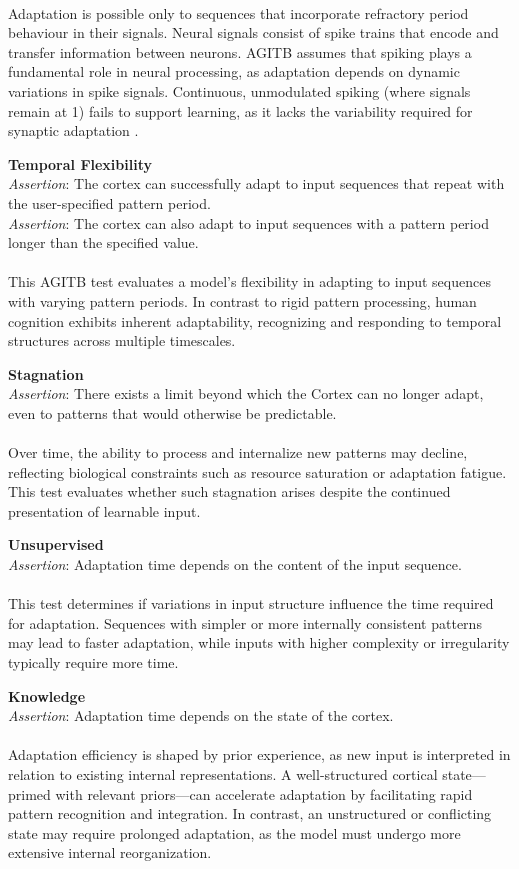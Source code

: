 \documentclass{article}
\newcommand{\agitbtest}[2]{
  \item
  \begin{minipage}[t]{\linewidth}
    \textbf{#1} \\[0.5ex]
    #2
  \end{minipage}
}
\begin{document}
\begin{agitblist}
{\\
Adaptation is possible only to sequences that incorporate refractory period behaviour in their signals. Neural signals consist of spike trains that encode and transfer information between neurons. AGITB assumes that spiking plays a fundamental role in neural processing, as adaptation depends on dynamic variations in spike signals. Continuous, unmodulated spiking (where signals remain at 1) fails to support learning, as it lacks the variability required for synaptic adaptation \cite{Gerstner2002}. 
}
\agitbtest{Temporal Flexibility}{
\emph{Assertion}: The cortex can successfully adapt to input sequences that repeat with the user-specified pattern period.\\
\emph{Assertion}: The cortex can also adapt to input sequences with a pattern period longer than the specified value.\\
\\
This AGITB test evaluates a model’s flexibility in adapting to input sequences with varying pattern periods. In contrast to rigid pattern processing, human cognition exhibits inherent adaptability, recognizing and responding to temporal structures across multiple timescales.
}
\agitbtest{Stagnation}{
\emph{Assertion}: There exists a limit beyond which the Cortex can no longer adapt, even to patterns that would otherwise be predictable.\\
\\
Over time, the ability to process and internalize new patterns may decline, reflecting biological constraints such as resource saturation or adaptation fatigue. This test evaluates whether such stagnation arises despite the continued presentation of learnable input.
}
\agitbtest{Unsupervised}{
\emph{Assertion}: Adaptation time depends on the content of the input sequence.\\
\\
This test determines if variations in input structure influence the time required for adaptation. Sequences with simpler or more internally consistent patterns may lead to faster adaptation, while inputs with higher complexity or irregularity typically require more time. 
}
\agitbtest{Knowledge}{
\emph{Assertion}: Adaptation time depends on the state of the cortex.\\
\\
Adaptation efficiency is shaped by prior experience, as new input is interpreted in relation to existing internal representations. A well-structured cortical state—primed with relevant priors—can accelerate adaptation by facilitating rapid pattern recognition and integration. In contrast, an unstructured or conflicting state may require prolonged adaptation, as the model must undergo more extensive internal reorganization.
}
\end{agitblist}
\end{document}
